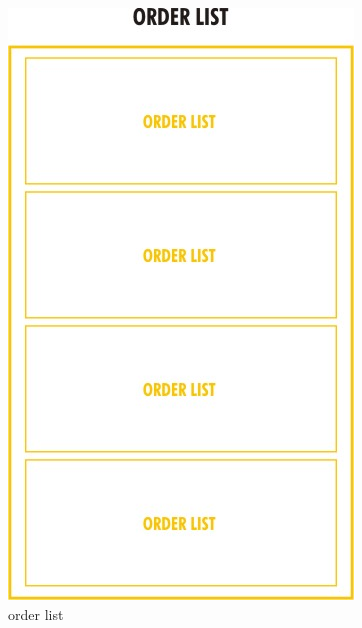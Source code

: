 \documentclass[12pt]{article}
\begin{document}
\begin{figure}
\centering
\includegraphics[scale=0.4]{milestone2/1.jpeg}
\caption{order list}


\end{figure}
\end{document}
